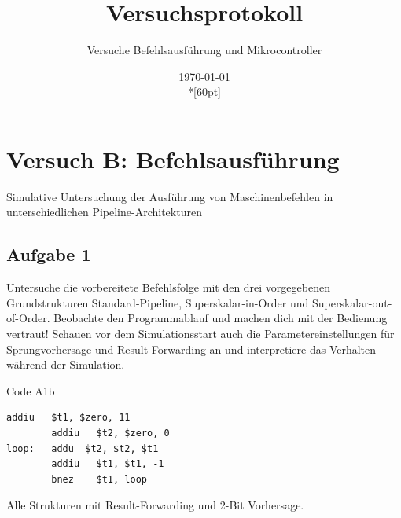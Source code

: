 \documentclass[a4paper,12pt,titlepage]{scrartcl}
\begin{document}
\titlehead
{
    \small
    {
        Technische Universität Ilmenau\\
        Fakulät IA\\
        Fachgebiet Rechnerarchitektur\\

        Praktikum Rechnerarchitektur 2\\
        WS 2021/22}
}

\title {Versuchsprotokoll}
\subtitle{Versuche Befehlsausführung und Mikrocontroller}
\author{}
\date{\today\\*[60pt]}
\maketitle  %

\pagestyle{fancy}
\newpage

\section*{Versuch B: Befehlsausführung}
Simulative Untersuchung der Ausführung von Maschinenbefehlen in unterschiedlichen Pipeline-Architekturen

\subsection*{Aufgabe 1}
Untersuche die vorbereitete Befehlsfolge mit den drei vorgegebenen Grundstrukturen Standard-Pipeline, Superskalar-in-Order und Superskalar-out-of-Order. Beobachte den Programmablauf und machen dich mit der Bedienung vertraut! Schauen vor dem Simulationsstart auch die Parametereinstellungen für Sprungvorhersage und Result Forwarding an  und interpretiere das Verhalten während der Simulation.

Code A1b
\begin{lstlisting}[basicstyle=\tiny]
        addiu   $t1, $zero, 11
        addiu   $t2, $zero, 0
loop:   addu  $t2, $t2, $t1
        addiu   $t1, $t1, -1
        bnez    $t1, loop
\end{lstlisting}
Alle Strukturen mit Result-Forwarding und 2-Bit Vorhersage.
\end{document}
